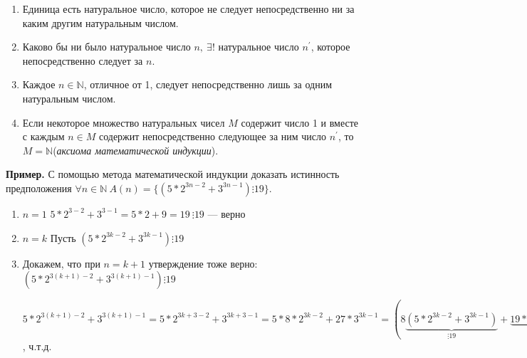 \documentclass{article}
\begin{document}
    \begin{enumerate}
        \item Единица есть натуральное число, которое не следует непосредственно ни за каким другим натуральным числом.
        \item Каково бы ни было натуральное число \(n,\ \exists!\) натуральное число \(n^\prime\), которое непосредственно следует за \(n\).
        \item Каждое \(n \in \mathbb{N}\), отличное от 1, следует непосредственно лишь за одним натуральным числом.
        \item Если некоторое множество натуральных чисел \(M\) содержит число 1 и вместе с каждым \(n \in M\) содержит непосредственно следующее за ним число \(n^\prime\), то \(M = \mathbb{N}\)(\textit{аксиома математической индукции}).
    \end{enumerate}

    \textbf{Пример.} С помощью метода математической индукции доказать истинность предположения \(\forall n \in \mathbb{N}\ A(n) = \{(5*2^{3n-2} + 3^{3n-1}) \vdots 19\}\).
    \begin{enumerate}
        \item \(n=1\) \quad \(5*2^{3-2} + 3^{3-1} = 5*2 + 9 = 19\ \vdots 19\) --- верно
        \item \(n=k\) \quad Пусть \((5*2^{3k-2} + 3^{3k-1}) \vdots 19\)
        \item Докажем, что при \(n = k+1\) утверждение тоже верно: \((5 * 2^{3(k+1)-2} + 3^{3(k+1)-1}) \vdots 19\)
        
        \(5 * 2^{3(k+1)-2} + 3^{3(k+1)-1} = 5 * 2^{3k+3-2} + 3^{3k+3-1} = 5 * 8 * 2^{3k-2} + 27 * 3^{3k-1} = (8 \underset{\vdots 19}{\underbrace{(5*2^{3k-2} + 3^{3k-1})}} + \underset{\vdots 19}{\underbrace{19 * 3^{3k-1}}})\ \vdots 19\), ч.т.д.
    \end{enumerate}
\end{document}
